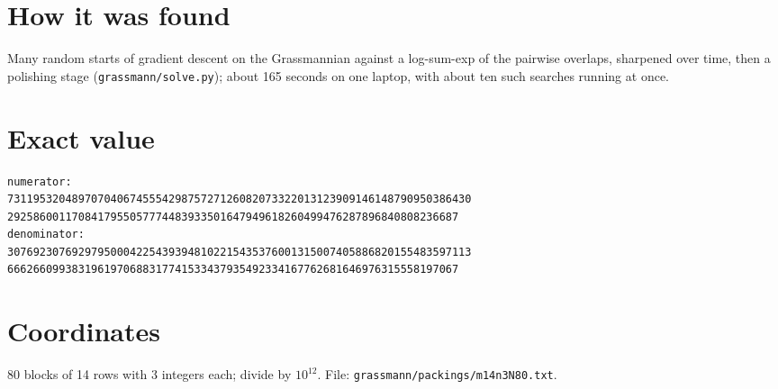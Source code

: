 \documentclass[11pt,a4paper]{article}
\begin{document}
\section{How it was found}
Many random starts of gradient descent on the Grassmannian against a log-sum-exp of the pairwise overlaps, sharpened over time, then a polishing stage (\texttt{grassmann/solve.py}); about 165 seconds on one laptop, with about ten such searches running at once.


\appendix
\section{Exact value}
{\small
\begin{verbatim}
numerator:
731195320489707040674555429875727126082073322013123909146148790950386430
2925860011708417955057774483933501647949618260499476287896840808236687
denominator:
307692307692979500042254393948102215435376001315007405886820155483597113
6662660993831961970688317741533437935492334167762681646976315558197067
\end{verbatim}}

\section{Coordinates}
80 blocks of 14 rows with 3 integers each; divide by $10^{12}$. File: \texttt{grassmann/packings/m14n3N80.txt}.
{\tiny
\begin{multicols}{3}
\end{multicols}}
\end{document}
